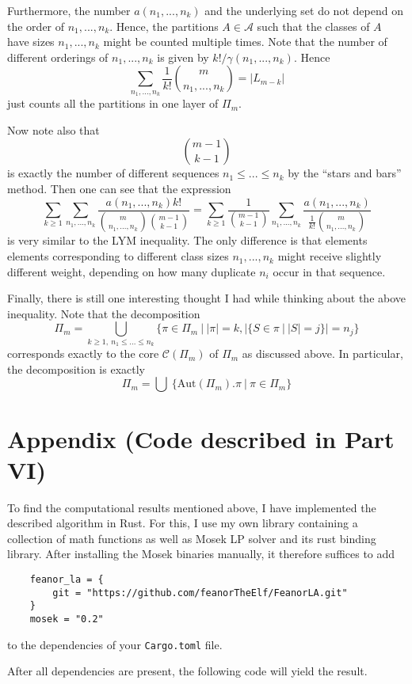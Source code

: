 \documentclass{scrartcl}
\theoremstyle{definition}
\begin{document}
Furthermore, the number $a(n_1, ..., n_k)$ and the underlying set do not depend on the order of $n_1, ..., n_k$.
Hence, the partitions $A \in \mathcal{A}$ such that the classes of $A$ have sizes $n_1, ..., n_k$ might be counted multiple times.
Note that the number of different orderings of $n_1, ..., n_k$ is given by $k!/\gamma(n_1, ..., n_k)$.
Hence
\begin{equation*}
    \sum_{n_1, ..., n_k} \frac 1 {k!} {m \choose n_1, ..., n_k} = |L_{m - k}|
\end{equation*}
just counts all the partitions in one layer of $\Pi_m$.

Now note also that
\begin{equation*}
    {m - 1 \choose k - 1}
\end{equation*}
is exactly the number of different sequences $n_1 \leq ... \leq n_k$ by the ``stars and bars'' method.
Then one can see that the expression
\begin{equation*}    
    \sum_{k \geq 1} \sum_{n_1, ..., n_k} \frac {a(n_1, ..., n_k) k!} {{m \choose n_1, ..., n_k} {m - 1 \choose k - 1}} = \sum_{k \geq 1} \frac 1 {{m - 1 \choose k - 1}} \sum_{n_1, ..., n_k} \frac {a(n_1, ..., n_k)} {\frac 1 {k!} {m \choose n_1, ..., n_k}}
\end{equation*}
is very similar to the LYM inequality.
The only difference is that elements elements corresponding to different class sizes $n_1, ..., n_k$ might receive slightly different weight, depending on how many duplicate $n_i$ occur in that sequence.

Finally, there is still one interesting thought I had while thinking about the above inequality.
Note that the decomposition
\begin{equation*}
    \Pi_m = \bigcup_{k \geq 1, \ n_1 \leq ... \leq n_k} \{ \pi \in \Pi_m \ | \ |\pi| = k, |\{ S \in \pi \ | \ |S| = j \}| = n_j \}
\end{equation*}
corresponds exactly to the core $\mathcal{C}(\Pi_m)$ of $\Pi_m$ as discussed above.
In particular, the decomposition is exactly
\begin{equation*}
    \Pi_m = \bigcup \ \{ \mathrm{Aut}(\Pi_m).\pi \ | \ \pi \in \Pi_m \}
\end{equation*}

\section{Appendix (Code described in Part VI)}
To find the computational results mentioned above, I have implemented the described algorithm in Rust.
For this, I use my own library containing a collection of math functions as well as Mosek LP solver \cite{mosek} and its rust binding library.
After installing the Mosek binaries manually, it therefore suffices to add
\begin{lstlisting}
    feanor_la = { 
        git = "https://github.com/feanorTheElf/FeanorLA.git"  
    }
    mosek = "0.2"
\end{lstlisting}
to the dependencies of your \texttt{Cargo.toml} file.

After all dependencies are present, the following code will yield the result.


\printbibliography
\end{document}
